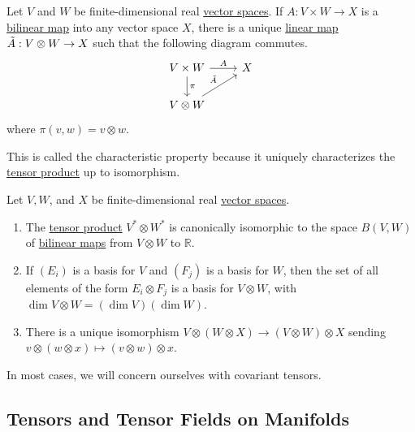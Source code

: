 \documentclass{article}
\newcounter{theorem}[section]
\begin{document}
    \begin{theorem}
      \label{thm:characteristic-property-of-tensor-products}
    Let $V$ and $W$ be finite-dimensional real \hyperref[lin-def:vector-space]{vector spaces}. If $A: V \times W \to X$ is a \hyperref[lin-def:bilinear-map]{bilinear map} into any vector space $X$, there is a unique \hyperref[lin-def:linear_map]{linear map} $\Tilde{A}: V \otimes W \to X$ such that the following diagram commutes. 
    \begin{equation}
      \begin{tikzcd}
          V \times W \arrow{r}{A} \arrow{d}{\pi} & X \\
          V \otimes W \arrow{ru}{\Tilde{A}}
          \end{tikzcd}
    \end{equation}
    where $\pi(v, w) = v \otimes w$. 
    \end{theorem}

    This is called the characteristic property because it uniquely characterizes the \hyperref[def:tensor-product]{tensor product} up to isomorphism. 

    \begin{theorem}
      \label{thm:properties-of-tensor-products}
    Let $V, W$, and $X$ be finite-dimensional real \hyperref[lin-def:vector-space]{vector spaces}. 
    \begin{enumerate}
        \item The \hyperref[def:tensor-product]{tensor product} $V^* \otimes W^*$ is canonically isomorphic to the space $B(V, W)$ of \hyperref[lin-def:bilinear-map]{bilinear maps} from $V \otimes W$ to $\mathbb{R}$. 
        \item If $(E_i)$ is a basis for $V$ and $(F_j)$ is a basis for $W$, then the set of all elements of the form $E_i \otimes F_j$ is a basis for $V \otimes W$, with $\dim{V\otimes W} = (\dim{V}) (\dim{W})$. 
        \item There is a unique isomorphism $V \otimes (W \otimes X) \to (V \otimes W) \otimes X$ sending $v \otimes (w \otimes x) \mapsto (v \otimes w) \otimes x$. 
    \end{enumerate}
    \end{theorem}

    In most cases, we will concern ourselves with covariant tensors. 

  \subsection{Tensors and Tensor Fields on Manifolds}
\end{document}
